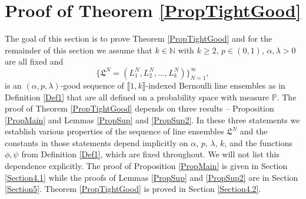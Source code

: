 %
\section{Proof of Theorem \ref{PropTightGood} }\label{Section4}


The goal of this section is to prove Theorem \ref{PropTightGood} and for the remainder of this section we assume that $k \in \mathbb{N}$ with $k \geq 2$, $p \in (0,1)$, $\alpha, \lambda > 0$ are all fixed and 
\begin{equation*}
\big\{\mathfrak{L}^N = (L^N_1,L^N_2, \dots, L^N_k)\big\}_{N=1}^{\infty},
\end{equation*}
is an $(\alpha,p,\lambda)$-good sequence of $\llbracket 1, k\rrbracket$-indexed Bernoulli line ensembles as in Definition \ref{Def1} that are all defined on a probability space with measure $\mathbb{P}$. The proof of Theorem \ref{PropTightGood} depends on three results -- Proposition \ref{PropMain} and Lemmas \ref{PropSup} and \ref{PropSup2}. In these three statements we establish various properties of the sequence of line ensembles $\mathfrak{L}^N$ and the constants in those statements depend implicitly on $\alpha$, $p$, $\lambda$, $k$, and the functions $\phi, \psi$ from Definition \ref{Def1}, which are fixed throughout. We will not list this dependence explicitly. The proof of Proposition \ref{PropMain} is given in Section \ref{Section4.1} while the proofs of Lemmas \ref{PropSup} and \ref{PropSup2} are in Section \ref{Section5}. Theorem \ref{PropTightGood} is proved in Section \ref{Section4.2}.
%
